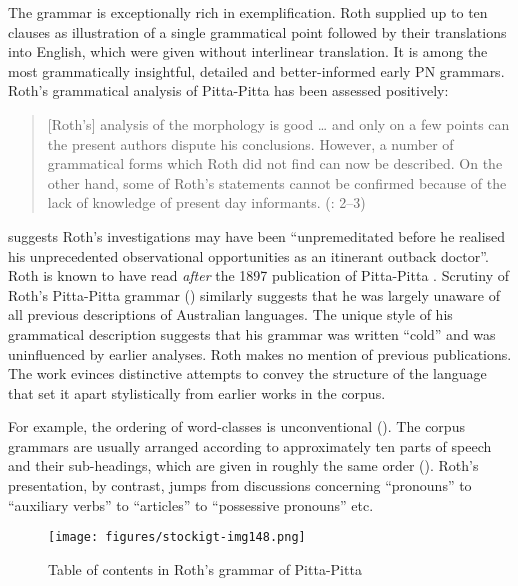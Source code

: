 The grammar is exceptionally rich in exemplification. Roth supplied up to ten clauses as illustration of a single grammatical point followed by their translations into English, which were given without interlinear translation. It is among the most grammatically insightful, detailed and better-informed early PN grammars. Roth’s grammatical analysis of Pitta-Pitta has been assessed positively:

\begin{quote}
[Roth’s] analysis of the morphology is good … and only on a few points can the present authors dispute his conclusions. However, a number of grammatical forms which Roth did not find can now be described. On the other hand, some of Roth’s statements cannot be confirmed because of the lack of knowledge of present day informants. (\citealt{blake_pitta-pitta_1971}: 2--3)
\end{quote}

\citet[114]{mulvaney_oxford_2008} suggests Roth’s investigations may have been “unpremeditated before he realised his unprecedented observational opportunities as an itinerant outback doctor”. Roth is known to have read \citet{fison_kamilaroi_1880} \textit{after} the 1897 publication of Pitta-Pitta \citep[114]{mulvaney_oxford_2008}. Scrutiny of Roth’s Pitta-Pitta grammar (\citeyear{roth_ethnological_1897}) similarly suggests that he was largely unaware of all previous descriptions of Australian languages. The unique style of his grammatical description suggests that his grammar was written “cold” and was uninfluenced by earlier analyses. Roth makes no mention of previous publications. The work evinces distinctive attempts to convey the structure of the language that set it apart stylistically from earlier works in the corpus.

For example, the ordering of word-classes is unconventional (). The corpus grammars are usually arranged according to approximately ten parts of speech and their sub-headings, which are given in roughly the same order (). Roth’s presentation, by contrast, jumps from discussions concerning “pronouns” to “auxiliary verbs” to “articles” to “possessive pronouns” etc.


\begin{figure}
\texttt{[image: figures/stockigt-img148.png]}
\caption{Table of contents in Roth’s grammar of Pitta-Pitta \citeyearpar[vi]{roth_ethnological_1897}}
\label{bkm:Ref323755944}
\label{fig:key:201}
\end{figure}

